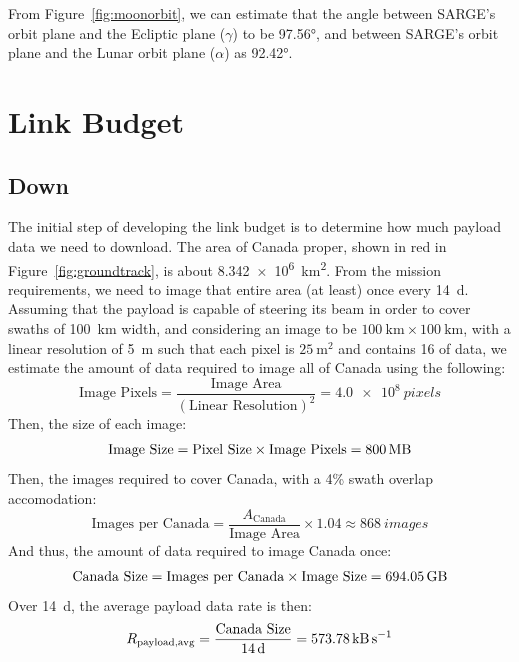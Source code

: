 \documentclass[9pt]{article}
\begin{document}
From Figure~\ref{fig:moonorbit}, we can estimate that the angle between SARGE's orbit plane and the Ecliptic plane ($\gamma$) to be \ang{97.56}, and between SARGE's orbit plane and the Lunar orbit plane ($\alpha$) as \ang{92.42}.

\section{Link Budget}\label{app:linkbudget}
\subsection{Down}
The initial step of developing the link budget is to determine how much payload data we need to download.
The area of Canada proper, shown in red in Figure~\ref{fig:groundtrack}, is about \qty{8.342e6}{\kilo\meter\squared}.
From the mission requirements, we need to image that entire area (at least) once every \qty{14}{\day}.
Assuming that the payload is capable of steering its beam in order to cover swaths of \qty{100}{\kilo\meter} width, and considering an image to be $\qty{100}{\kilo\meter}\times\qty{100}{\kilo\meter}$, with a linear resolution of \qty{5}{\meter} such that each pixel is $\qty{25}{\meter\squared}$ and contains \qty{16}{\bit} of data, we estimate the amount of data required to image all of Canada using the following:
\begin{equation}
  \text{Image Pixels} = \frac{\text{Image Area}}{(\text{Linear Resolution})^2}=\qty{4.0e8}{pixels}
\end{equation}
Then, the size of each image:
\begin{equation}
  \text{Image Size} = \text{Pixel Size}\times\text{Image Pixels} = \qty{800}{\mega\byte}
\end{equation}
Then, the images required to cover Canada, with a 4\% swath overlap accomodation:
\begin{equation}
  \text{Images per Canada} = \frac{A_\text{Canada}}{\text{Image Area}}\times 1.04 \approx \qty{868}{images}
\end{equation}
And thus, the amount of data required to image Canada once:
\begin{equation}
  \text{Canada Size} = \text{Images per Canada} \times \text{Image Size} = \qty{694.05}{\giga\byte}
\end{equation}
Over \qty{14}{\day}, the average payload data rate is then:
\begin{equation}
  R_\text{payload,avg} = \frac{\text{Canada Size}}{\qty{14}{\day}}=\qty{573.78}{\kilo\byte\per\second}
\end{equation}
\end{document}
